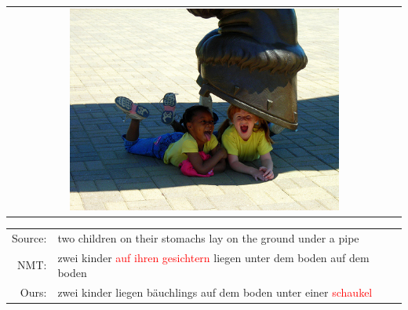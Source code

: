 \begin{table}[h]
\renewcommand{\arraystretch}{1.2}
\begin{subtable}{0.22\textwidth}
\centering
\begin{tabular}{c}
\includegraphics[width=0.7\textwidth]{chapters/IJCNLP/images/533602654.jpg}
\end{tabular}
\end{subtable}%
\begin{subtable}{0.75\textwidth}
\begin{tabular}{rp{27em}}
Source: & two children on their stomachs lay on the ground under a pipe \\
NMT: & zwei kinder \textcolor{red}{auf ihren gesichtern} liegen unter dem boden auf dem boden \\
Ours: & zwei kinder liegen bäuchlings auf dem boden unter einer \textcolor{red}{schaukel}
 \\
\end{tabular}
\end{subtable}

\vspace{0em}


\end{table}
